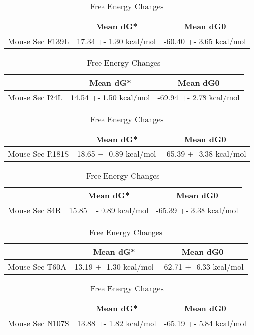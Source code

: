 \begin{table}[ht]
  \centering
  \begin{tabular}{|c|c|c|}
  \hline
    & Mean dG* & Mean dG0 \\
  \hline
  Mouse Sec F139L & 17.34 +- 1.30 kcal/mol & -60.40 +- 3.65 kcal/mol \\
  \hline
  \end{tabular}
  \caption{Free Energy Changes}
\end{table}

\begin{table}[ht]
  \centering
  \begin{tabular}{|c|c|c|}
  \hline
    & Mean dG* & Mean dG0 \\
  \hline
  Mouse Sec I24L & 14.54 +- 1.50 kcal/mol & -69.94 +- 2.78 kcal/mol \\
  \hline
  \end{tabular}
  \caption{Free Energy Changes}
\end{table}

\begin{table}[ht]
  \centering
  \begin{tabular}{|c|c|c|}
  \hline
    & Mean dG* & Mean dG0 \\
  \hline
  Mouse Sec R181S & 18.65 +- 0.89 kcal/mol & -65.39 +- 3.38 kcal/mol \\
  \hline
  \end{tabular}
  \caption{Free Energy Changes}
\end{table}

\begin{table}[ht]
  \centering
  \begin{tabular}{|c|c|c|}
  \hline
    & Mean dG* & Mean dG0 \\
  \hline
  Mouse Sec S4R & 15.85 +- 0.89 kcal/mol & -65.39 +- 3.38 kcal/mol \\
  \hline
  \end{tabular}
  \caption{Free Energy Changes}
\end{table}

\begin{table}[ht]
  \centering
  \begin{tabular}{|c|c|c|}
  \hline
    & Mean dG* & Mean dG0 \\
  \hline
  Mouse Sec T60A & 13.19 +- 1.30 kcal/mol & -62.71 +- 6.33 kcal/mol \\
  \hline
  \end{tabular}
  \caption{Free Energy Changes}
\end{table}

\begin{table}[ht]
  \centering
  \begin{tabular}{|c|c|c|}
  \hline
    & Mean dG* & Mean dG0 \\
  \hline
  Mouse Sec N107S & 13.88 +- 1.82 kcal/mol & -65.19 +- 5.84 kcal/mol \\
  \hline
  \end{tabular}
  \caption{Free Energy Changes}
\end{table}
